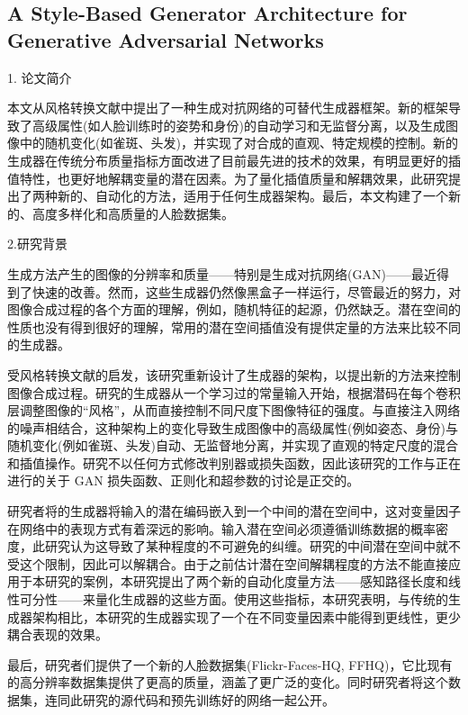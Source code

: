 \subsection{A Style-Based Generator Architecture for Generative Adversarial Networks}

1. 论文简介

本文从风格转换文献中提出了一种生成对抗网络的可替代生成器框架。新的框架导致了高级属性(如人脸训练时的姿势和身份)的自动学习和无监督分离，以及生成图像中的随机变化(如雀斑、头发)，并实现了对合成的直观、特定规模的控制。新的生成器在传统分布质量指标方面改进了目前最先进的技术的效果，有明显更好的插值特性，也更好地解耦变量的潜在因素。为了量化插值质量和解耦效果，此研究提出了两种新的、自动化的方法，适用于任何生成器架构。最后，本文构建了一个新的、高度多样化和高质量的人脸数据集。

2.研究背景

生成方法产生的图像的分辨率和质量——特别是生成对抗网络(GAN)——最近得到了快速的改善。然而，这些生成器仍然像黑盒子一样运行，尽管最近的努力，对图像合成过程的各个方面的理解，例如，随机特征的起源，仍然缺乏。潜在空间的性质也没有得到很好的理解，常用的潜在空间插值没有提供定量的方法来比较不同的生成器。

受风格转换文献的启发，该研究重新设计了生成器的架构，以提出新的方法来控制图像合成过程。研究的生成器从一个学习过的常量输入开始，根据潜码在每个卷积层调整图像的“风格”，从而直接控制不同尺度下图像特征的强度。与直接注入网络的噪声相结合，这种架构上的变化导致生成图像中的高级属性(例如姿态、身份)与随机变化(例如雀斑、头发)自动、无监督地分离，并实现了直观的特定尺度的混合和插值操作。研究不以任何方式修改判别器或损失函数，因此该研究的工作与正在进行的关于 GAN 损失函数、正则化和超参数的讨论是正交的。

研究者将的生成器将输入的潜在编码嵌入到一个中间的潜在空间中，这对变量因子在网络中的表现方式有着深远的影响。输入潜在空间必须遵循训练数据的概率密度，此研究认为这导致了某种程度的不可避免的纠缠。研究的中间潜在空间中就不受这个限制，因此可以解耦合。由于之前估计潜在空间解耦程度的方法不能直接应用于本研究的案例，本研究提出了两个新的自动化度量方法——感知路径长度和线性可分性——来量化生成器的这些方面。使用这些指标，本研究表明，与传统的生成器架构相比，本研究的生成器实现了一个在不同变量因素中能得到更线性，更少耦合表现的效果。

最后，研究者们提供了一个新的人脸数据集(Flickr-Faces-HQ, FFHQ)，它比现有的高分辨率数据集提供了更高的质量，涵盖了更广泛的变化。同时研究者将这个数据集，连同此研究的源代码和预先训练好的网络一起公开。


